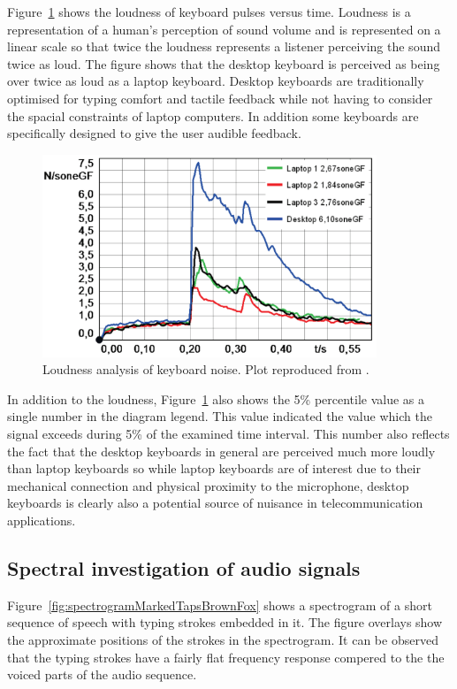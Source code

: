 Figure~\ref{fig:TypingLoudnessKeyboards} shows the loudness of keyboard pulses versus time. Loudness is a representation of a human's perception of sound volume and is represented on a linear scale so that twice the loudness represents a listener perceiving the sound twice as loud. The figure shows that the desktop keyboard is perceived as being over twice as loud as a laptop keyboard. Desktop keyboards are traditionally optimised for typing comfort and tactile feedback while not having to consider the spacial constraints of laptop computers. In addition some keyboards are specifically designed to give the user audible feedback\cite{Hauswirth2013}.

\begin{figure}[!] %
\centering
\includegraphics[width=100mm]{TypingLoudnessKeyboards.png}
\caption{Loudness analysis of keyboard noise. Plot reproduced from \cite{Hauswirth2013}.}\label{fig:TypingLoudnessKeyboards}
\end{figure}

In addition to the loudness, Figure~\ref{fig:TypingLoudnessKeyboards} also shows the 5\% percentile value as a single number in the diagram legend. This value indicated the value which the signal exceeds during 5\% of the examined time interval\cite{Hauswirth2013}. This number also reflects the fact that the desktop keyboards in general are perceived much more loudly than laptop keyboards so while laptop keyboards are of interest due to their mechanical connection and physical proximity to the microphone, desktop keyboards is clearly also a potential source of nuisance in telecommunication applications.

\subsection{Spectral investigation of audio signals}
Figure~\ref{fig:spectrogramMarkedTapsBrownFox} shows a spectrogram of a short sequence of speech with typing strokes embedded in it. The figure overlays show the approximate positions of the strokes in the spectrogram. It can be observed that the typing strokes have a fairly flat frequency response compered to the the voiced parts of the audio sequence.

